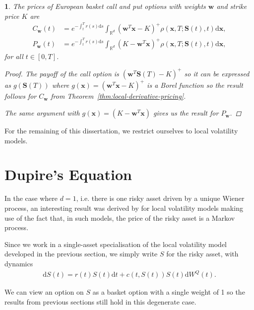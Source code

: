 \documentclass[english]{article}
\numberwithin{equation}{section}
\numberwithin{figure}{section}
\theoremstyle{bolddescit}
\theoremstyle{definition}
\theoremstyle{definition}
\theoremstyle{plain}
\theoremstyle{plain}
\newtheorem{corollary}[theorem]{\protect\corollaryname}
\theoremstyle{bolddesc}
\theoremstyle{plain}
\theoremstyle{remark}
\providecommand{\corollaryname}{Corollary}
\begin{document}
\begin{corollary}\label{cor:local-option-pricing}
  The prices of European basket call and put options with weights $\mathbf{w}$ and strike price $K$ are
  \begin{align*}
    C_\mathbf{w}(t)
    &= e^{-\int_t^T r(s) \mathrm{d}s} \int_{\mathbb{R}^d} \left(\mathbf{w}^T\mathbf{x} - K\right)^+ \rho(\mathbf{x},T;\mathbf{S}(t),t) \mathrm{d}\mathbf{x},\\
    P_\mathbf{w}(t)
    &= e^{-\int_t^T r(s) \mathrm{d}s} \int_{\mathbb{R}^d} \left(K - \mathbf{w}^T\mathbf{x}\right)^+ \rho(\mathbf{x},T;\mathbf{S}(t),t) \mathrm{d}\mathbf{x},
  \end{align*}
  for all $t \in [0,T]$.

  \begin{proof}
    The payoff of the call option is $(\mathbf{w}^T \mathbf{S}(T) - K)^+$ so it can be expressed as $g(\mathbf{S}(T))$ where $g(\mathbf{x}) = (\mathbf{w}^T \mathbf{x} - K)^+$ is a Borel function so the result follows for $C_\mathbf{w}$ from Theorem~\ref{thm:local-derivative-pricing}.

    The same argument with $g(\mathbf{x}) = (K - \mathbf{w}^T \mathbf{x})$ gives us the result for $P_\mathbf{w}$.
  \end{proof}
\end{corollary}

For the remaining of this dissertation, we restrict ourselves to local volatility models.

\section{Dupire's Equation}\label{sec:dupire}

In the case where $d=1$, i.e. there is one risky asset driven by a unique Wiener process, an interesting result was derived by \textcite{dupire_pricing_1993} for local volatility models making use of the fact that, in such models, the price of the risky asset is a Markov process.

Since we work in a single-asset specialisation of the local volatility model developed in the previous section, we simply write $S$ for the risky asset, with dynamics
\begin{align*}
  \mathrm{d}S(t) = r(t) S(t) \mathrm{d}t + c(t,S(t)) S(t) \mathrm{d}W^Q(t).
\end{align*}

We can view an option on $S$ as a basket option with a single weight of 1 so the results from previous sections still hold in this degenerate case.
\end{document}

